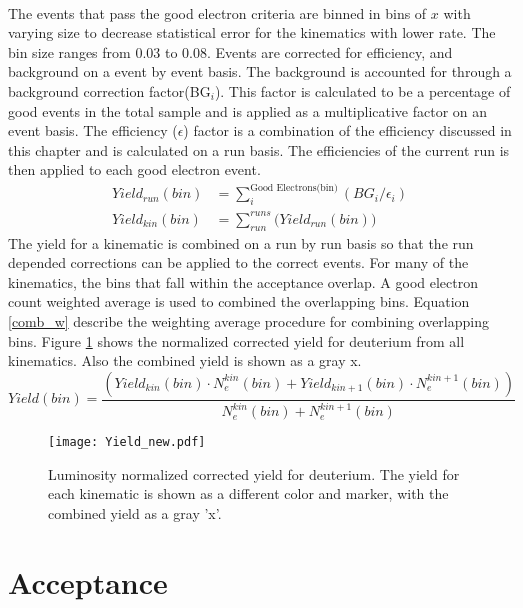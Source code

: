 \paragraph{}The events that pass the good electron criteria are binned in bins of $x$ with varying size to decrease statistical error for the kinematics with lower rate. The bin size ranges from 0.03 to 0.08. Events are corrected for efficiency, and background on a event by event basis. The background is accounted for through a background correction factor(BG$_i$). This factor is calculated to be a percentage of good events in the total sample and is applied as a multiplicative factor on an event basis. The efficiency ($\epsilon$) factor is a combination of the efficiency discussed in this chapter and is calculated on a run basis. The efficiencies of the current run is then applied to each good electron event. 
\begin{align}
Yield_{run}(bin) &= \sum_{i}^{\text{Good Electrons(bin)} } \left( BG_{i}/\epsilon_{i} \right) \nonumber\\
Yield_{kin}(bin) &= \sum_{run}^{runs} \bigg( Yield_{run}(bin) \bigg)
\end{align}
The yield for a kinematic is combined on a run by run basis so that the run depended corrections can be applied to the correct events. For many of the kinematics, the bins that fall within the acceptance overlap. A good electron count weighted average is used to combined the overlapping bins. Equation \ref{comb_w} describe the weighting average procedure for combining overlapping bins. Figure \ref{kinYield} shows the normalized corrected yield for deuterium from all kinematics. Also the combined yield is shown as a gray x. 
\begin{equation}
Yield(bin) = \frac{\left( Yield_{kin}(bin)\cdot N_e^{kin}(bin)+ Yield_{kin+1}(bin)\cdot N_e^{kin+1}(bin) \right)}{N_e^{kin}(bin)+N_e^{kin+1}(bin)} \label{comb_w}
\end{equation}
\begin{figure}
	\caption{Luminosity normalized corrected yield for deuterium. The yield for each kinematic is shown as a different color and marker, with the combined yield as a gray 'x'.  \label{kinYield}}
	\texttt{[image: Yield\_new.pdf]}
\end{figure}
\section{Acceptance } 
